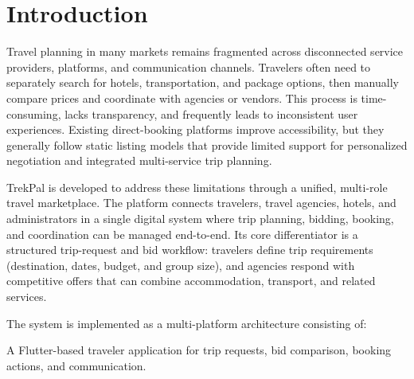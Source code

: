 \documentclass[12pt,a4paper]{article}
\makeatletter
\newcommand{\TocUnderlineEntry}{\@ifnextchar\numberline{\TocUnderlineNumbered}{\TocUnderlineUnnumbered}}
\def\TocUnderlineNumbered\numberline#1#2\TocUnderlineEnd{\numberline{#1}\uline{#2}}
\def\TocUnderlineUnnumbered#1\TocUnderlineEnd{\uline{#1}}
\newlength{\ThesisParagraphIndent}
\newcommand{\ThesisParagraph}[1]{%
  \par\begingroup
  \setlength{\leftskip}{\ThesisParagraphIndent}%
  \setlength{\parindent}{0pt}%
  \noindent#1\par
  \endgroup}
\makeatother
\begin{document}
\clearpage

{
\setlength{\parskip}{0pt}
\let\OriginalTocContentsLine\contentsline
\renewcommand{\contentsline}[4]{\OriginalTocContentsLine{#1}{\TocUnderlineEntry#2\TocUnderlineEnd}{#3}{#4}}
\tableofcontents
}

\clearpage

{\setlength{\parskip}{0pt}\listoffigures}

\clearpage

{\setlength{\parskip}{0pt}\listoftables}

\clearpage


\pagestyle{thesis}

\section{Introduction}

\ThesisParagraph{Travel planning in many markets remains fragmented across disconnected service providers, platforms, and communication channels. Travelers often need to separately search for hotels, transportation, and package options, then manually compare prices and coordinate with agencies or vendors. This process is time-consuming, lacks transparency, and frequently leads to inconsistent user experiences. Existing direct-booking platforms improve accessibility, but they generally follow static listing models that provide limited support for personalized negotiation and integrated multi-service trip planning.}


\ThesisParagraph{TrekPal is developed to address these limitations through a unified, multi-role travel marketplace. The platform connects travelers, travel agencies, hotels, and administrators in a single digital system where trip planning, bidding, booking, and coordination can be managed end-to-end. Its core differentiator is a structured trip-request and bid workflow: travelers define trip requirements (destination, dates, budget, and group size), and agencies respond with competitive offers that can combine accommodation, transport, and related services.}


\ThesisParagraph{The system is implemented as a multi-platform architecture consisting of:}


\begin{list}{}{\setlength{\leftmargin}{\dimexpr\ThesisParagraphIndent+1.5em\relax}\setlength{\labelsep}{0.5em}\setlength{\topsep}{2pt}\setlength{\parsep}{0pt}}
\item[\textbullet] A Flutter-based traveler application for trip requests, bid comparison, booking actions, and communication.
\end{list}
\end{document}
